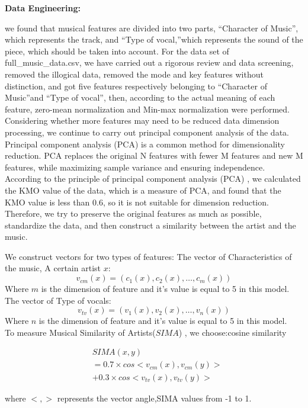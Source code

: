 \documentclass[conference]{IEEEtran}
\begin{document}
\textbf{Data Engineering:}

we found that musical features are divided into two parts, “Character of Music”, which represents the track, and “Type of vocal,”which represents the sound of the piece, which should be taken into account. For the data set of full\_music\_data.csv, we have carried out a rigorous review and data screening, removed the illogical data, removed the mode and key features without distinction, and got five features respectively belonging to “Character of Music”and “Type of vocal”, then, according to the actual meaning of each feature, zero-mean normalization and Min-max normalization were performed. Considering whether more features may need to be reduced data dimension processing, we continue to carry out principal component analysis of the data. Principal component analysis (PCA) is a common method for dimensionality reduction. PCA replaces the original N features with fewer M features and new M features, while maximizing sample variance and ensuring independence. According to the principle of principal component analysis (PCA) , we calculated the KMO value of the data, which is a measure of PCA, and found that the KMO value is less than 0.6, so it is not suitable for dimension reduction. Therefore, we try to preserve the original features as much as possible, standardize the data, and then construct a similarity between the artist and the music.

We construct vectors for two types of features:
The vector of Characteristics of the music, A certain artist $x$:
\[v_{cm}(x)=(c_1(x),c_2(x),\ldots,c_m(x))\]
Where $m$ is the dimension of feature and it's value is equal to 5  in this model. \\
The vector of Type of vocals:
\[v_{tv}(x)=(v_1(x),v_2(x),\ldots,v_n(x))\]
Where $n$ is the dimension of feature and it's value is equal to 5  in this model.\\
To measure Musical Similarity of Artists($SIMA$) , we choose:cosine similarity

\begin{equation}\label{eq:Simlarity of music}
	\begin{aligned}
		& SIMA(x,y)\\
		& =0.7\times cos<v_{cm}(x),v_{cm}(y)>\\
		& + 0.3\times cos<v_{tv}(x),v_{tv}(y)>
	\end{aligned}
\end{equation}

where $<,>$ represents the vector angle,SIMA values from -1 to 1.
\end{document}
